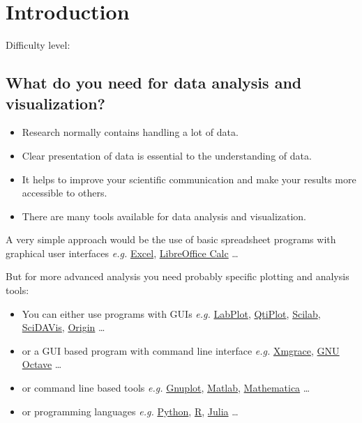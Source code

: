 \documentclass[
  letterpaper,
  DIV=11,
  numbers=noendperiod]{scrreprt}
\providecommand{\tightlist}{%
  \setlength{\itemsep}{0pt}\setlength{\parskip}{0pt}}\usepackage{longtable,booktabs,array}
\begin{document}
\chapter{Introduction}\label{introduction}

Difficulty level: { }

\section*{What do you need for data analysis and
visualization?}\label{what-do-you-need-for-data-analysis-and-visualization}


\begin{itemize}
\tightlist
\item
  Research normally contains handling a lot of data.
\item
  Clear presentation of data is essential to the understanding of data.
\item
  It helps to improve your scientific communication and make your
  results more accessible to others.
\item
  There are many tools available for data analysis and visualization.
\end{itemize}

A very simple approach would be the use of basic spreadsheet programs
with graphical user interfaces \emph{e.g.}
\href{https://www.microsoft.com/de-at/microsoft-365/excel}{Excel},
\href{https://de.libreoffice.org/}{LibreOffice Calc} \ldots{}

But for more advanced analysis you need probably specific plotting and
analysis tools:

\begin{itemize}
\tightlist
\item
  You can either use programs with GUIs \emph{e.g.}
  \href{https://labplot.kde.org/}{LabPlot},
  \href{https://www.qtiplot.com/}{QtiPlot},
  \href{https://www.scilab.org/}{Scilab},
  \href{https://scidavis.sourceforge.net/}{SciDAVis},
  \href{https://www.originlab.com/}{Origin} \ldots{}
\item
  or a GUI based program with command line interface \emph{e.g.}
  \href{https://plasma-gate.weizmann.ac.il/Grace/}{Xmgrace},
  \href{https://octave.org/}{GNU Octave} \ldots{}
\item
  or command line based tools \emph{e.g.}
  \href{http://www.gnuplot.info/}{Gnuplot},
  \href{https://de.mathworks.com/products/matlab.html}{Matlab},
  \href{https://www.wolfram.com/mathematica/}{Mathematica} \ldots{}
\item
  or programming languages \emph{e.g.}
  \href{https://www.python.org/}{Python},
  \href{https://www.r-project.org/ju}{R},
  \href{https://julialang.org/}{Julia} \ldots{}
\end{itemize}
\end{document}

